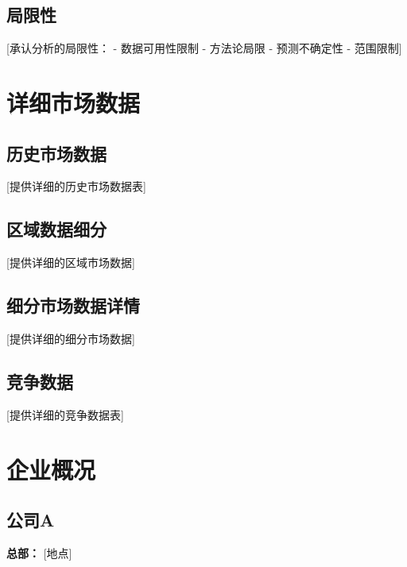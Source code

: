 \documentclass[11pt,letterpaper]{report}
\begin{document}
{\section{局限性}

[承认分析的局限性：
- 数据可用性限制
- 方法论局限
- 预测不确定性
- 范围限制]

\chapter{详细市场数据}

\section{历史市场数据}

[提供详细的历史市场数据表]

\section{区域数据细分}

[提供详细的区域市场数据]

\section{细分市场数据详情}

[提供详细的细分市场数据]

\section{竞争数据}

[提供详细的竞争数据表]

\chapter{企业概况}

\section{公司A}

\begin{calloutbox}
\textbf{总部：} [地点]


\end{calloutbox}}
\end{document}
